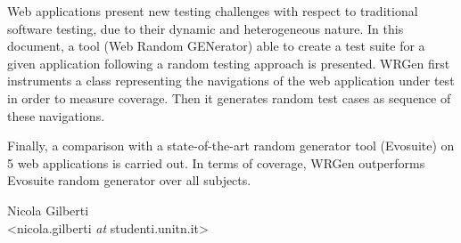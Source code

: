 Web applications present new testing challenges with respect to traditional software testing, due to their dynamic and heterogeneous nature. In this document, a tool (Web Random GENerator) able to create a test suite for a given application following a random testing approach is presented. WRGen first instruments a class representing the navigations of the web application under test in order to measure coverage. Then it generates random test cases as sequence of these navigations.

Finally, a comparison with a state-of-the-art random generator tool (Evosuite) on 5 web applications is carried out. In terms of coverage, WRGen outperforms Evosuite random generator over all subjects.

\vfill\noindent
\hfill
\begin{flushright}
\begin{minipage}[b]{0.45\textwidth}
 \centering
  Nicola Gilberti\\
 {\footnotesize <nicola.gilberti \textit{at} studenti.unitn.it>}
\end{minipage}
\end{flushright}
\newpage